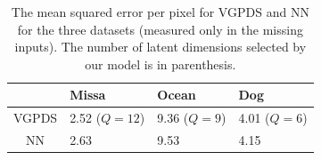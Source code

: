 \documentclass{article} %
\begin{document}
\begin{table}[h]
\caption{
\small{
The mean squared error per pixel for VGPDS and NN for the three datasets (measured only in the missing inputs). The number of latent dimensions selected by our model is in parenthesis. 
} }
\label{videoResultsTable}
\begin{center}
\begin{tabular}{c||l|l|l}
  & Missa & Ocean & Dog \\
\hline \hline
VGPDS  & 2.52 ($Q = 12$) & 9.36 ($Q = 9$)  & 4.01 ($Q = 6$) \\  \hline
NN  & 2.63 & 9.53 & 4.15 \\
\end{tabular}
\end{center}
\end{table}
\end{document}
